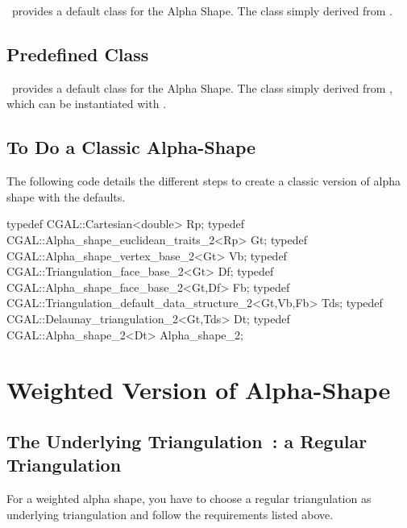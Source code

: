 \cgal\ provides a default  class
for the Alpha Shape. The class
 simply derived from 
.


\subsection*{Predefined \protect {} Class}

\cgal\ provides a default  class
for the Alpha Shape. The class
 simply derived from 
, which can be instantiated with .



\subsection*{To Do a Classic Alpha-Shape}

\ccExample
The following code details the different steps to create 
a classic version of alpha shape with the defaults.

\begin{cprog}
typedef CGAL::Cartesian<double> Rp;
typedef CGAL::Alpha_shape_euclidean_traits_2<Rp> Gt;
typedef CGAL::Alpha_shape_vertex_base_2<Gt> Vb;
typedef CGAL::Triangulation_face_base_2<Gt> Df;
typedef CGAL::Alpha_shape_face_base_2<Gt,Df> Fb;
typedef CGAL::Triangulation_default_data_structure_2<Gt,Vb,Fb> Tds;
typedef CGAL::Delaunay_triangulation_2<Gt,Tds> Dt;
typedef CGAL::Alpha_shape_2<Dt> Alpha_shape_2;
\end{cprog}


\section{Weighted Version of Alpha-Shape}

\subsection*{The Underlying Triangulation~: a Regular Triangulation}

For a weighted alpha shape, you have to choose a regular triangulation as
underlying triangulation  and follow the requirements listed above.

